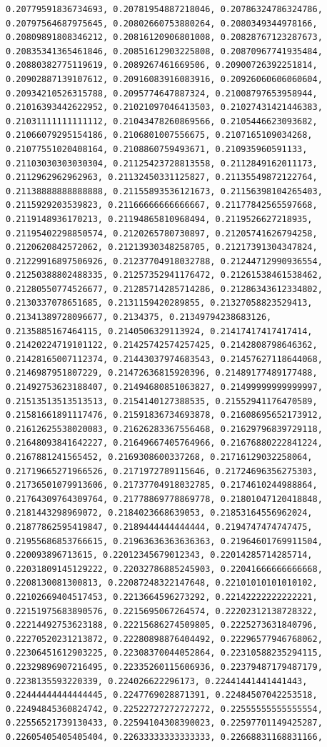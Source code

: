 \documentclass[11pt]{article}
\begin{document}
\begin{Verbatim}[commandchars=\\\{\}]
0.20779591836734693, 0.20781954887218046, 0.20786324786324786, 0.20797564687975645, 0.20802660753880264, 0.2080349344978166, 0.20809891808346212, 0.20816120906801008, 0.20828767123287673, 0.20835341365461846, 0.20851612903225808, 0.20870967741935484, 0.20880382775119619, 0.2089267461669506, 0.20900726392251814, 0.20902887139107612, 0.20916083916083916, 0.20926060606060604, 0.20934210526315788, 0.2095774647887324, 0.21008797653958944, 0.21016393442622952, 0.21021097046413503, 0.21027431421446383, 0.21031111111111112, 0.21043478260869566, 0.2105446623093682, 0.21066079295154186, 0.2106801007556675, 0.2107165109034268, 0.21077551020408164, 0.2108860759493671, 0.210935960591133, 0.21103030303030304, 0.21125423728813558, 0.2112849162011173, 0.2112962962962963, 0.21132450331125827, 0.21135549872122764, 0.21138888888888888, 0.21155893536121673, 0.21156398104265403, 0.2115929203539823, 0.21166666666666667, 0.21177842565597668, 0.2119148936170213, 0.21194865810968494, 0.2119526627218935, 0.21195402298850574, 0.2120265780730897, 0.21205741626794258, 0.2120620842572062, 0.21213930348258705, 0.21217391304347824, 0.21229916897506926, 0.21237704918032788, 0.21244712990936554, 0.21250388802488335, 0.21257352941176472, 0.21261538461538462, 0.21280550774526677, 0.21285714285714286, 0.21286343612334802, 0.2130337078651685, 0.2131159420289855, 0.21327058823529413, 0.21341389728096677, 0.2134375, 0.21349794238683126, 0.2135885167464115, 0.2140506329113924, 0.21417417417417414, 0.21420224719101122, 0.21425742574257425, 0.2142808798646362, 0.21428165007112374, 0.21443037974683543, 0.21457627118644068, 0.2146987951807229, 0.21472636815920396, 0.21489177489177488, 0.21492753623188407, 0.21494680851063827, 0.21499999999999997, 0.21513513513513513, 0.2154140127388535, 0.21552941176470589, 0.21581661891117476, 0.21591836734693878, 0.21608695652173912, 0.21612625538020083, 0.21626283367556468, 0.21629796839729118, 0.21648093841642227, 0.21649667405764966, 0.21676880222841224, 0.2167881241565452, 0.2169308600337268, 0.21716129032258064, 0.21719665271966526, 0.2171972789115646, 0.21724696356275303, 0.21736501079913606, 0.21737704918032785, 0.2174610244988864, 0.21764309764309764, 0.21778869778869778, 0.21801047120418848, 0.2181443298969072, 0.2184023668639053, 0.21853164556962024, 0.21877862595419847, 0.2189444444444444, 0.2194747474747475, 0.21955686853766615, 0.21963636363636363, 0.21964601769911504, 0.220093896713615, 0.22012345679012343, 0.22014285714285714, 0.22031809145129222, 0.22032786885245903, 0.22041666666666668, 0.2208130081300813, 0.22087248322147648, 0.22101010101010102, 0.22102669404517453, 0.2213664596273292, 0.22142222222222221, 0.22151975683890576, 0.2215695067264574, 0.22202312138728322, 0.22214492753623188, 0.22215686274509805, 0.2225273631840796, 0.22270520231213872, 0.22280898876404492, 0.22296577946768062, 0.22306451612903225, 0.22308370044052864, 0.22310588235294115, 0.22329896907216495, 0.22335260115606936, 0.22379487179487179, 0.2238135593220339, 0.224026622296173, 0.22441441441441443, 0.22444444444444445, 0.2247769028871391, 0.22484507042253518, 0.22494845360824742, 0.22522727272727272, 0.22555555555555554, 0.22556521739130433, 0.22594104308390023, 0.22597701149425287, 0.22605405405405404, 0.22633333333333333, 0.22668831168831166, 
\end{Verbatim}
\end{document}
